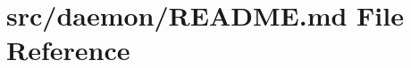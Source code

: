 \hypertarget{src_2daemon_2README_8md}{}\section{src/daemon/\+R\+E\+A\+D\+ME.md File Reference}
\label{src_2daemon_2README_8md}
